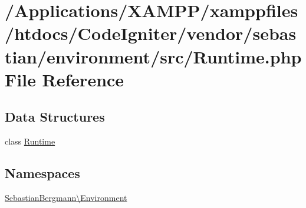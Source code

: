 \hypertarget{_runtime_8php}{}\section{/\+Applications/\+X\+A\+M\+P\+P/xamppfiles/htdocs/\+Code\+Igniter/vendor/sebastian/environment/src/\+Runtime.php File Reference}
\label{_runtime_8php}
\subsection*{Data Structures}
\begin{DoxyCompactItemize}
\item 
class \mbox{\hyperlink{class_sebastian_bergmann_1_1_environment_1_1_runtime}{Runtime}}
\end{DoxyCompactItemize}
\subsection*{Namespaces}
\begin{DoxyCompactItemize}
\item 
 \mbox{\hyperlink{namespace_sebastian_bergmann_1_1_environment}{Sebastian\+Bergmann\textbackslash{}\+Environment}}
\end{DoxyCompactItemize}
